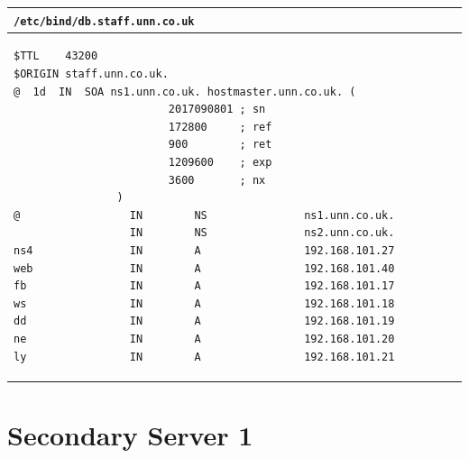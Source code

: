 \documentclass[11pt]{article}
\begin{document}
\begin{table}[ht]
    \begin{tabular}{|p{17.5cm}|} 
        \hline
        \texttt{\textbf{/etc/bind/db.staff.unn.co.uk}}\\ 
        \hline
        \lstset{
                basicstyle=\scriptsize\ttfamily,
              }
              \begin{lstlisting}
$TTL    43200 
$ORIGIN staff.unn.co.uk.
@  1d  IN  SOA ns1.unn.co.uk. hostmaster.unn.co.uk. (
                        2017090801 ; sn
                        172800     ; ref
                        900        ; ret
                        1209600    ; exp
                        3600       ; nx
                )
@                 IN        NS               ns1.unn.co.uk.
                  IN        NS               ns2.unn.co.uk.
ns4               IN        A                192.168.101.27
web               IN        A                192.168.101.40
fb                IN        A                192.168.101.17                                
ws                IN        A                192.168.101.18                                
dd                IN        A                192.168.101.19                                
ne                IN        A                192.168.101.20                        
ly                IN        A                192.168.101.21
        \end{lstlisting}\\
        \hline
    \end{tabular}
\end{table}

\clearpage
\section{Secondary Server 1}
\end{document}
